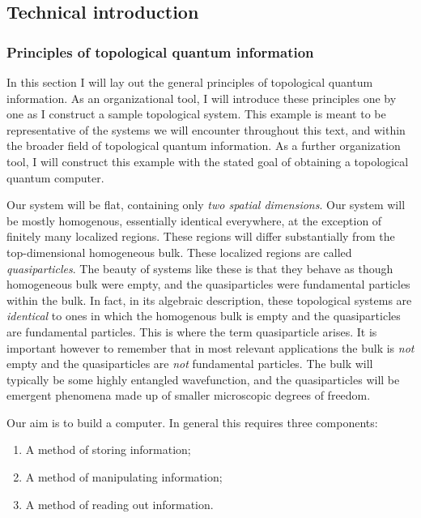 \documentclass{article}
\theoremstyle{definition}
\numberwithin{figure}{section}
\begin{document}
\subsection{Technical introduction}
\label{technical introduction}

\subsubsection{Principles of topological quantum information}

In this section I will lay out the general principles of topological quantum information. As an organizational tool, I will introduce these principles one by one as I construct a sample topological system. This example is meant to be representative of the systems we will encounter throughout this text, and within the broader field of topological quantum information. As a further organization tool, I will construct this example with the stated goal of obtaining a topological quantum computer.

Our system will be flat, containing only \textit{two spatial dimensions}. Our system will be mostly homogenous, essentially identical everywhere, at the exception of finitely many localized regions. These regions will differ substantially from the top-dimensional homogeneous bulk. These localized regions are called \textit{quasiparticles}. The beauty of systems like these is that they behave as though homogeneous bulk were empty, and the quasiparticles were fundamental particles within the bulk. In fact, in its algebraic description, these topological systems are \textit{identical} to ones in which the homogenous bulk is empty and the quasiparticles are fundamental particles. This is where the term quasiparticle arises. It is important however to remember that in most relevant applications the bulk is \textit{not} empty and the quasiparticles are \textit{not} fundamental particles. The bulk will typically be some highly entangled wavefunction, and the quasiparticles will be emergent phenomena made up of smaller microscopic degrees of freedom.

Our aim is to build a computer. In general this requires three components:

\begin{enumerate}
\item A method of storing information;
\item A method of manipulating information;
\item A method of reading out information.
\end{enumerate}
\end{document}
